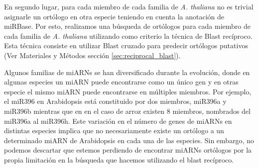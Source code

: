 En segundo lugar, para cada miembro de cada familia de \textit{A. thaliana} no es trivial asignarle un ortólogo en otra especie teniendo en cuenta la anotación de miRBase.
Por esto, realizamos una búsqueda de ortólogos para cada miembro de cada familia de \textit{A. thaliana} utilizando como criterio la técnica de Blast recíproco.
Esta técnica consiste en utilizar Blast cruzado para predecir ortólogos putativos (Ver Materiales y Métodos sección \ref{sec:reciprocal_blast}).



Algunos familias de miARNs se han diversificado durante la evolución, donde en algunas especies un miARN puede encontrarse como un único gen y en otras especie el mismo miARN puede encontrarse en múltiples miembros.
Por ejemplo, el miR396 en Arabidopsis está constituido por dos miembros, miR396a y miR396b mientras que en en el caso de arroz existen 8 miembros, nombrados del miR396a al miR396h.
Este variación en el número de genes de miARNs en distintas especies implica que no necesariamente existe un ortólogo a un determinado miARN de Arabidopsis en cada una de las especies.
Sin embargo, no podemos descartar que estemos perdiendo de encontrar miARNs ortólogos por la propia limitación en la búsqueda que hacemos utilizando el blast recíproco.


